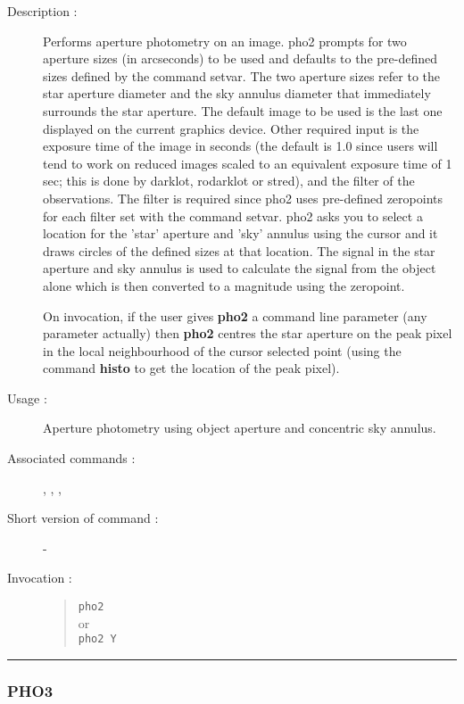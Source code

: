 \begin{description}

\item[Description :] Performs aperture photometry on an image.  pho2
prompts for two aperture sizes (in arcseconds) to be used and defaults
to the pre-defined sizes defined by the command setvar.  The two
aperture sizes refer to the star aperture diameter and the sky annulus
diameter that immediately surrounds the star aperture. The default
image to be used is the last one displayed on the current graphics
device.  Other required input is the exposure time of the image in
seconds (the default is 1.0 since users will tend to work on reduced
images scaled to an equivalent exposure time of 1 sec; this is done by
darklot, rodarklot or stred), and the filter of the observations.  The
filter is required since pho2 uses pre-defined zeropoints for each
filter set with the command setvar. pho2 asks you to select a location
for the 'star' aperture and 'sky' annulus using the cursor and it draws
circles of the defined sizes at that location. The signal in the star
aperture and sky annulus is used to calculate the signal from the
object alone which is then converted to a magnitude using
the zeropoint.  

On invocation, if the user gives {\bf pho2} a command line parameter
(any parameter actually) then {\bf pho2} centres the star aperture on
the peak pixel in the local neighbourhood of the cursor selected point
(using the command {\bf histo} to get the location of the peak pixel).

\item [Usage :] Aperture photometry using object aperture and concentric sky
annulus.
\item [Associated commands :] {\tt {}}, 
{\tt {}}, {\tt {}}, 
{\tt {}}
\item [Short version of command :] -

\item[Invocation :]

\begin{quote}{\tt  pho2 }\\
or \\
{\tt pho2 Y }
\end{quote}

\end{description}

\hrule 
\subsubsection*{\label{PHO3}PHO3}

